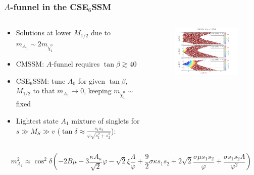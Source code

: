\documentclass[10pt,aspectratio=169]{beamer}
\begin{document}
\begin{frame}
  \frametitle{$A$-funnel in the CSE$_6$SSM}
  \begin{columns}[t]
    \begin{column}{0.5\textwidth}
      \begin{itemize} \itemsep1.5em
        \vfill
      \item Solutions at lower $M_{1/2}$ due to
        $m_{A_1} \sim 2 m_{\tilde{\chi}_1^0}$
        \vfill
      \item CMSSM: $A$-funnel requires $\tan\beta \gtrsim 40$
        \vfill
      \item CSE$_6$SSM: tune $A_0$ for given $\tan\beta$, $M_{1/2}$ to that
        $m_{A_1} \rightarrow 0$, keeping $m_{\tilde{\chi}_1^0} \sim$ fixed
        \vfill
      \item Lightest state $A_1$ mixture of singlets for $s \gg M_S \gg v$
        ($\tan\delta \approx \frac{s_1 s_2}{\varphi \sqrt{s_1^2 + s_2^2}}$):
        \vfill
      \end{itemize}
    \end{column}
    \begin{column}{0.5\textwidth}
      \vspace{-55pt}
      \begin{figure}
        \includegraphics[width=8cm]{cmssm_a_funnel}
      \end{figure}
    \end{column}
  \end{columns}
  \vspace{10pt}
  \begin{equation*}
    m_{A_1}^2 \approx \cos^2\delta \left ( -2 B\mu
    - 3 \frac{\kappa A_\kappa}{\sqrt{2}} \varphi
    - \sqrt{2} \xi \frac{\Lambda}{\varphi} + \frac{9}{2}
    \sigma \kappa s_1 s_2 + 2\sqrt{2} \frac{\sigma \mu s_1 s_2}{\varphi}
    + \frac{\sigma s_1 s_2 \Lambda}{\varphi^2} \right )
  \end{equation*}
\end{frame}
\end{document}
